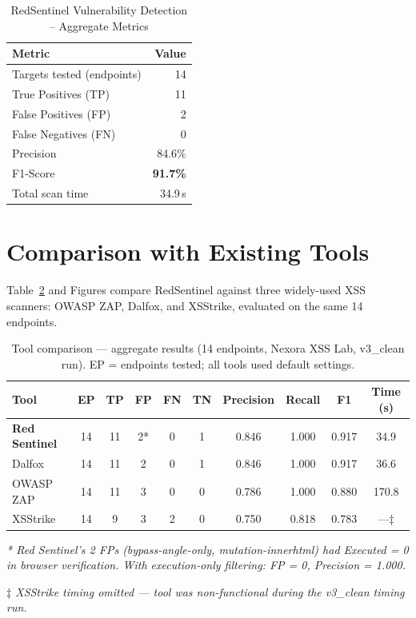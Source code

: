 \begin{table}[H]
  \centering
 
  \begin{tabular}{lr}
    \toprule
    \rowcolor{headblue}
    \textbf{Metric} & \textbf{Value} \\
    \midrule
    Targets tested (endpoints) & 14 \\
    True Positives (TP)        & 11 \\
    False Positives (FP)       & 2  \\
    False Negatives (FN)       & 0 \\
    Precision                  & 84.6\% \\
    F1-Score                   & \textbf{91.7\%} \\
    Total scan time            & 34.9\,s \\
    \bottomrule
  \end{tabular}
   \caption{RedSentinel Vulnerability Detection -- Aggregate Metrics}
  \label{tab:vuln_detection}
\end{table}
\section{Comparison with Existing Tools}
Table~\ref{tab:tool_cmp} and Figures compare RedSentinel against three widely-used XSS scanners: OWASP ZAP, Dalfox, and XSStrike, evaluated on the same 14 endpoints.
 
\begin{table}[ht]
\centering
\renewcommand{\arraystretch}{1.2}
\begin{tabular}{|l|c|c|c|c|c|c|c|c|c|}
\hline
\textbf{Tool} & \textbf{EP} & \textbf{TP} & \textbf{FP} & \textbf{FN} & \textbf{TN} & \textbf{Precision} & \textbf{Recall} & \textbf{F1} & \textbf{Time (s)} \\
\hline
\textbf{Red Sentinel} & 14 & 11 & 2* & 0 & 1 & 0.846 & 1.000 & 0.917 & 34.9 \\
\hline
Dalfox & 14 & 11 & 2 & 0 & 1 & 0.846 & 1.000 & 0.917 & 36.6 \\
\hline
OWASP ZAP & 14 & 11 & 3 & 0 & 0 & 0.786 & 1.000 & 0.880 & 170.8 \\
\hline
XSStrike & 14 & 9 & 3 & 2 & 0 & 0.750 & 0.818 & 0.783 & ---$\ddagger$ \\
\hline
\end{tabular}

\vspace{0.3cm}

\caption{Tool comparison --- aggregate results (14 endpoints, Nexora XSS Lab, v3\_clean run). EP = endpoints tested; all tools used default settings.}
\label{tab:tool_cmp}

\vspace{0.2cm}

\footnotesize
\textit{* Red Sentinel's 2 FPs (bypass-angle-only, mutation-innerhtml) had Executed = 0 in browser verification. With execution-only filtering: FP = 0, Precision = 1.000.}

\textit{$\ddagger$ XSStrike timing omitted --- tool was non-functional during the v3\_clean timing run.}

\end{table}

